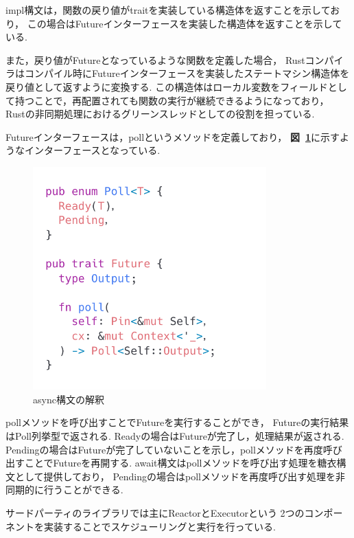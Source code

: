 \documentclass[a4paper,11pt]{jreport}
\newcommand\figref[1]{\textbf{図~\ref{fig:#1}}}
\begin{document}
impl構文は，関数の戻り値がtraitを実装している構造体を返すことを示しており，
この場合はFutureインターフェースを実装した構造体を返すことを示している.

また，戻り値がFutureとなっているような関数を定義した場合，
Rustコンパイラはコンパイル時にFutureインターフェースを実装したステートマシン構造体を戻り値として返すように変換する.
この構造体はローカル変数をフィールドとして持つことで，再配置されても関数の実行が継続できるようになっており，
Rustの非同期処理におけるグリーンスレッドとしての役割を担っている. 

Futureインターフェースは，pollというメソッドを定義しており，
\figref{future}に示すようなインターフェースとなっている.
\begin{figure}[tb]
	\centering
	\includegraphics[width=9cm, bb=0 0 800 550]{figures/future_trait.png}
	\caption{async構文の解釈}
	\label{fig:future}
\end{figure}
pollメソッドを呼び出すことでFutureを実行することができ，
Futureの実行結果はPoll列挙型で返される.
Readyの場合はFutureが完了し，処理結果が返される.
Pendingの場合はFutureが完了していないことを示し，pollメソッドを再度呼び出すことでFutureを再開する.
await構文はpollメソッドを呼び出す処理を糖衣構文として提供しており，
Pendingの場合はpollメソッドを再度呼び出す処理を非同期的に行うことができる.

サードパーティのライブラリでは主にReactorとExecutorという
2つのコンポーネントを実装することでスケジューリングと実行を行っている.
\end{document}
